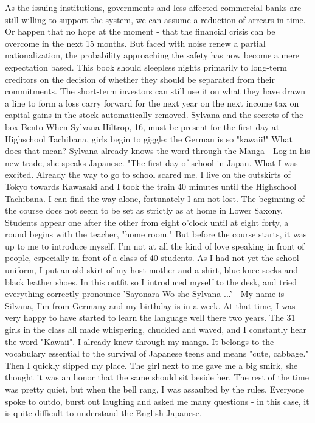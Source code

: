As the issuing institutions, governments and less affected commercial banks are still willing to support the system, we can assume a reduction of arrears in time.
Or happen that no hope at the moment - that the financial crisis can be overcome in the next 15 months.
But faced with noise renew a partial nationalization, the probability approaching the safety has now become a mere expectation based.
This book should sleepless nights primarily to long-term creditors on the decision of whether they should be separated from their commitments.
The short-term investors can still use it on what they have drawn a line to form a loss carry forward for the next year on the next income tax on capital gains in the stock automatically removed.
Sylvana and the secrets of the box Bento
When Sylvana Hiltrop, 16, must be present for the first day at Highschool Tachibana, girls begin to giggle: the German is so "kawaii!"
What does that mean?
Sylvana already knows the word through the Manga - Log in his new trade, she speaks Japanese.
"The first day of school in Japan.
What-I was excited.
Already the way to go to school scared me.
I live on the outskirts of Tokyo towards Kawasaki and I took the train 40 minutes until the Highschool Tachibana.
I can find the way alone, fortunately I am not lost.
The beginning of the course does not seem to be set as strictly as at home in Lower Saxony.
Students appear one after the other from eight o'clock until at eight forty, a round begins with the teacher, "home room."
But before the course starts, it was up to me to introduce myself.
I'm not at all the kind of love speaking in front of people, especially in front of a class of 40 students.
As I had not yet the school uniform, I put an old skirt of my host mother and a shirt, blue knee socks and black leather shoes.
In this outfit so I introduced myself to the desk, and tried everything correctly pronounce 'Sayonara Wo she Sylvana ...' - My name is Silvana, I'm from Germany and my birthday is in a week.
At that time, I was very happy to have started to learn the language well there two years.
The 31 girls in the class all made whispering, chuckled and waved, and I constantly hear the word "Kawaii".
I already knew through my manga.
It belongs to the vocabulary essential to the survival of Japanese teens and means "cute, cabbage."
Then I quickly slipped my place.
The girl next to me gave me a big smirk, she thought it was an honor that the same should sit beside her.
The rest of the time was pretty quiet, but when the bell rang, I was assaulted by the rules.
Everyone spoke to outdo, burst out laughing and asked me many questions - in this case, it is quite difficult to understand the English Japanese.
